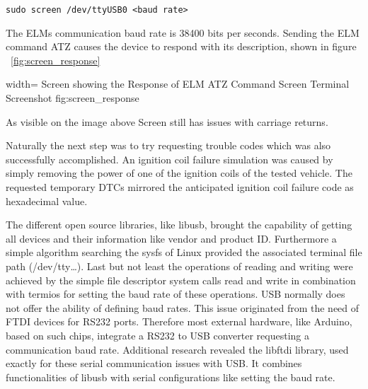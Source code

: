 \begin{verbatim}
sudo screen /dev/ttyUSB0 <baud rate> 
\end{verbatim}

The ELMs communication baud rate is 38400 bits per seconds. Sending the ELM command ATZ causes the device to respond with its description, shown in figure
~\ref{fig:screen_response}

 {width=\textwidth}%
 {Screen showing the Response of ELM ATZ Command}%
 {Screen Terminal Screenshot}%
 {fig:screen_response}%

As visible on the image above Screen still has issues with carriage returns.

Naturally the next step was to try requesting trouble codes which was also successfully accomplished. An ignition coil failure simulation was 
caused by simply removing the power of one of the ignition coils of the tested vehicle. The requested temporary DTCs mirrored the anticipated 
ignition coil failure code as hexadecimal value. 


The different open source libraries, like libusb, brought the capability of getting all devices and their information like vendor and product ID.
Furthermore a simple algorithm searching the sysfs of Linux provided the associated terminal file path (/dev/tty…). Last but not least the 
operations of reading and writing were achieved by the simple file descriptor system calls read and write in combination with termios for 
setting the baud rate of these operations. USB normally does not offer the ability of defining baud rates. This issue originated from the need 
of FTDI devices for RS232 ports. Therefore most external hardware, like Arduino, based on such chips, integrate a RS232 to USB converter 
requesting a communication baud rate. Additional research revealed the libftdi library, used exactly for these serial communication issues with 
USB. It combines functionalities of libusb with serial configurations like setting the baud rate. 

